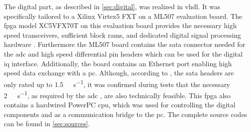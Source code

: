 \documentclass[12pt,a4paper,parskip=full,abstract=true,BCOR=12mm,twoside,open=right]{scrreprt}
\begin{document}
The digital part, as described in \cref{sec:digital}, was realized in \gls{vhdl}.
It was specifically tailored to a Xilinx Virtex5 FXT on a ML507 evaluation board.
The \gls{fpga} model XC5VFX70T on this evaluation board provides the necessary
high speed transceivers, sufficient block \glspl{ram}, and dedicated digital
signal processing hardware \cite{virtex5ds}. Furthermore the ML507 board contains
the \gls{sata} connector needed for the \gls{adc} and high speed differential
pin headers which can be used for the digital \gls{iq} interface. Additionally, the board contains an
Ethernet port enabling high speed data exchange with a \gls{pc}. Although, according to
\cite{ml507}, the \gls{sata} headers are only rated up to \SI{1.5}{\giga\bit\per\second},
it was confirmed during tests that the necessary \SI{2}{\giga\bit\per\second}, as required
by the \gls{adc} \cite{ltc2274}, are also technically feasible. This \gls{fpga} also contains a
hardwired PowerPC \gls{cpu}, which was used for controlling the digital components
and as a communication bridge to the \gls{pc}. The complete source codes can be found in \cref{sec:sources}.

\end{document}
